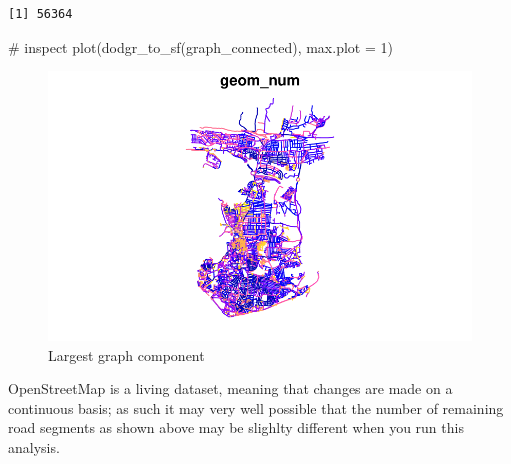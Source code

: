 \documentclass[
  letterpaper,
  DIV=11,
  numbers=noendperiod]{scrreprt}
\newenvironment{Shaded}{\begin{snugshade}}{\end{snugshade}}
\newcommand{\AttributeTok}[1]{\textcolor[rgb]{0.40,0.45,0.13}{#1}}
\newcommand{\CommentTok}[1]{\textcolor[rgb]{0.37,0.37,0.37}{#1}}
\newcommand{\DecValTok}[1]{\textcolor[rgb]{0.68,0.00,0.00}{#1}}
\newcommand{\FunctionTok}[1]{\textcolor[rgb]{0.28,0.35,0.67}{#1}}
\newcommand{\NormalTok}[1]{\textcolor[rgb]{0.00,0.23,0.31}{#1}}
\begin{document}
\begin{verbatim}
[1] 56364
\end{verbatim}

\begin{Shaded}
\begin{Highlighting}[]
\CommentTok{\# inspect}
\FunctionTok{plot}\NormalTok{(}\FunctionTok{dodgr\_to\_sf}\NormalTok{(graph\_connected), }\AttributeTok{max.plot =} \DecValTok{1}\NormalTok{)}
\end{Highlighting}
\end{Shaded}

\begin{figure}[H]

{\centering \includegraphics{02-network_files/figure-pdf/fig-ntx-extract-largest-graph-1.pdf}

}

\caption{\label{fig-ntx-extract-largest-graph}Largest graph component}

\end{figure}

\begin{tcolorbox}[enhanced jigsaw, rightrule=.15mm, colback=white, opacityback=0, opacitybacktitle=0.6, coltitle=black, colbacktitle=quarto-callout-warning-color!10!white, breakable, arc=.35mm, title=\textcolor{quarto-callout-warning-color}{\faExclamationTriangle}\hspace{0.5em}{Warning}, left=2mm, leftrule=.75mm, bottomtitle=1mm, toprule=.15mm, bottomrule=.15mm, colframe=quarto-callout-warning-color-frame, toptitle=1mm, titlerule=0mm]

OpenStreetMap is a living dataset, meaning that changes are made on a
continuous basis; as such it may very well possible that the number of
remaining road segments as shown above may be slighlty different when
you run this analysis.

\end{tcolorbox}
\end{document}
